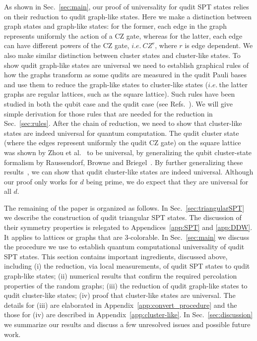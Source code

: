 \documentclass[aps,amsfonts,pra,twocolumn,showpacs]{revtex4-1}
\newcommand{\thatis}{$i.e.~$}
\begin{document}
As shown in Sec.~\ref{sec:main}, our proof of universality for qudit SPT states relies on their reduction to qudit graph-like states. Here we make a distinction between graph states and graph-like states: for the former, each edge in the graph represents uniformly the action of a CZ gate, whereas for the latter, each edge can have different powers of the CZ gate, \thatis $CZ^r$, where $r$ is edge dependent. We also make similar distinction between cluster states and cluster-like states. To show qudit graph-like states are universal we need to establish graphical rules of how the graphs transform as some qudits are measured in the qudit Pauli bases and use them to reduce the graph-like states to cluster-like states (\thatis the latter graphs are regular lattices, such as the square lattice). Such rules have been studied in both the qubit case and the qudit case (see Refs.~\cite{Hein2006, Bahramgiri2007}). We will give simple derivation for those rules that are needed for the reduction in Sec.~\ref{sec:rules}. After the chain of reduction, we need to show that cluster-like states are indeed universal for quantum computation. The qudit cluster state (where the edges represent uniformly the qudit CZ gate) on the square lattice was shown by Zhou et al.~\cite{Zhou2003} to be universal, by generalizing the qubit cluster-state formalism by Raussendorf, Browne and Briegel~\cite{Raussendorf2003}. By further generalizing these results~\cite{Raussendorf2003,Zhou2003}, we  can show that  qudit cluster-like states are indeed universal. Although our proof only works for $d$ being prime, we do expect that they are universal for all $d$.  

The remaining of the paper is organized as follows. In Sec.~\ref{sec:triangularSPT} we describe the construction of qudit triangular SPT states. The discussion of their symmetry properties is relegated to Appendices~\ref{app:SPT} and \ref{app:DDW}. It applies to lattices or graphs that are 3-colorable. 
 In Sec.~\ref{sec:main} we discuss the procedure we use to establish quantum computational universality of qudit SPT states. This section contains important ingredients, discussed above, including (i) the reduction, via local measurements, of qudit SPT states to qudit graph-like states; (ii) numerical results that confirm the required percolation properties of the random graphs; (iii) the reduction of qudit graph-like states to qudit cluster-like states; (iv) proof that cluster-like states are universal.  The details for (iii) are elaborated in Appendix~\ref{app:convert_procedure} and the those for (iv) are described in Appendix~\ref{app:cluster-like}. In Sec.~\ref{sec:discussion} we summarize our results and discuss a few unresolved issues and possible future work.
\end{document}
